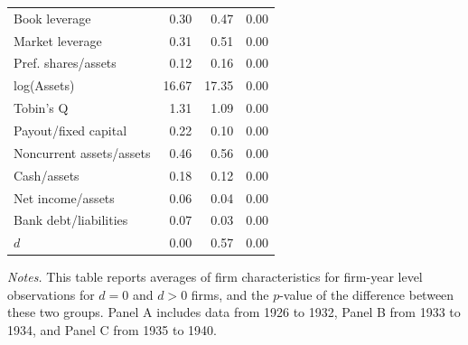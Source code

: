 \begin{table}[p]
\begin{tabular}{lrrr}
Book leverage & 0.30 & 0.47 & 0.00 \\
Market leverage & 0.31 & 0.51 & 0.00 \\
Pref. shares/assets & 0.12 & 0.16 & 0.00 \\
log(Assets) & 16.67 & 17.35 & 0.00 \\
Tobin's Q & 1.31 & 1.09 & 0.00 \\
Payout/fixed capital & 0.22 & 0.10 & 0.00 \\
Noncurrent assets/assets & 0.46 & 0.56 & 0.00 \\
Cash/assets & 0.18 & 0.12 & 0.00 \\
Net income/assets & 0.06 & 0.04 & 0.00 \\
Bank debt/liabilities & 0.07 & 0.03 & 0.00 \\
$d$ & 0.00 & 0.57 & 0.00 \\
\bottomrule
\end{tabular}

\vspace*{3mm} \justifying \noindent
\scriptsize{\textit{Notes.} This table reports averages of firm characteristics for firm-year level observations for $d = 0$ and $d > 0$ firms, and the $p$-value of the difference between these two groups. Panel A includes data from 1926 to 1932, Panel B from 1933 to 1934, and Panel C from 1935 to 1940. }
\end{table}
